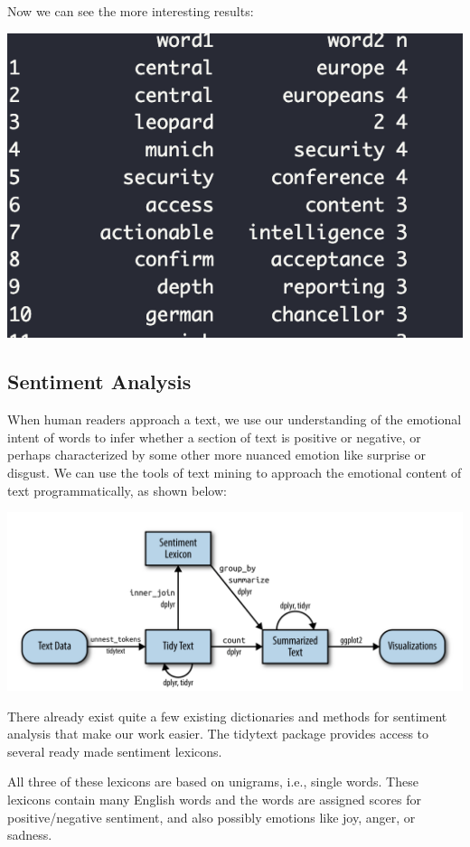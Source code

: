 \documentclass[
  letterpaper,
  DIV=11,
  numbers=noendperiod]{scrartcl}
\begin{document}
Now we can see the more interesting results:

\includegraphics{Images/4.png}

\hypertarget{sentiment-analysis}{%
\subsection{Sentiment Analysis}\label{sentiment-analysis}}

When human readers approach a text, we use our understanding of the
emotional intent of words to infer whether a section of text is positive
or negative, or perhaps characterized by some other more nuanced emotion
like surprise or disgust. We can use the tools of text mining to
approach the emotional content of text programmatically, as shown below:

\includegraphics{Images/5.png}

There already exist quite a few existing dictionaries and methods for
sentiment analysis that make our work easier. The tidytext package
provides access to several ready made sentiment lexicons.

All three of these lexicons are based on unigrams, i.e., single words.
These lexicons contain many English words and the words are assigned
scores for positive/negative sentiment, and also possibly emotions like
joy, anger, or sadness.
\end{document}
